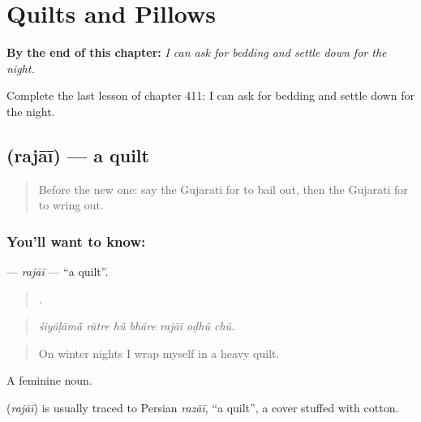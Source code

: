 
\chapter{Quilts and Pillows}
\label{ch:gu-quilts-and-pillows}

\begin{chapteropening}
\textbf{By the end of this chapter:} \emph{I can ask for bedding and settle down for the night.}

Complete the last lesson of chapter 411: I can ask for bedding and settle down for the night.
\end{chapteropening}

\section[\texorpdfstring{\gu{રજાઈ} (rajāī)}{રજાઈ (rajāī)}]{ (rajāī) — a quilt}

\label{lesson:GU-C411-rajai}



\begin{quote}
Before the new one: say the Gujarati for to bail out, then the Gujarati for to wring out.
\end{quote}

\subsection*{You'll want to know: }
\textbf{} — \emph{rajāī} — \textquotedblleft{}a quilt\textquotedblright{}.

\begin{quote}
      .
\end{quote}

\begin{quote}
\emph{śiyāḷāmā̃ rātre hũ bhāre rajāī oḍhũ chũ.}
\end{quote}

\begin{quote}
On winter nights I wrap myself in a heavy quilt.
\end{quote}

A feminine noun.

\begin{cousinweb}
\textbf{} (\emph{rajāī}) is usually traced to Persian \emph{razāī}, \textquotedblleft{}a quilt\textquotedblright{}, a cover stuffed with cotton.
\end{cousinweb}

